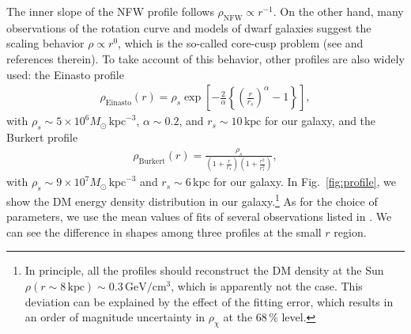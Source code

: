 \documentclass[12pt,twoside,book]{article}
\begin{document}
The inner slope of the NFW profile follows $\rho_{\mathrm{NFW}} \propto r^{-1}$.
On the other hand, many observations of the rotation curve and models of dwarf galaxies suggest the scaling behavior $\rho \propto r^0$, which is the so-called core-cusp problem (see \cite{Genina_2017} and references therein).
To take account of this behavior, other profiles are also widely used: the Einasto profile \cite{1965TrAlm...5...87E, Graham:2005xx}
\begin{align}
  \rho_{\mathrm{Einasto}} (r) = \rho_s \exp \left[
  -\frac{2}{\alpha} \left\{ \left( \frac{r}{r_s} \right)^\alpha - 1 \right\} \right],
\end{align}
with $\rho_s \sim 5 \times 10^6 M_\odot\, \mathrm{kpc}^{-3}$, $\alpha \sim 0.2$, and $r_s \sim 10\,\mathrm{kpc}$ for our galaxy, and the Burkert profile \cite{Burkert:1995yz}
\begin{align}
  \rho_{\mathrm{Burkert}} (r) = \frac{\rho_s}
  {\left( 1 + \frac{r}{r_s} \right) \left( 1 + \frac{r^2}{r_s^2} \right)},
\end{align}
with $\rho_s \sim 9 \times 10^7 M_\odot\, \mathrm{kpc}^{-3}$ and $r_s \sim 6\, \mathrm{kpc}$ for our galaxy.
In Fig.~\ref{fig:profile}, we show the DM energy density distribution in our galaxy.\footnote{
  In principle, all the profiles should reconstruct the DM density at the Sun $\rho (r \sim 8\, \mathrm{kpc}) \sim 0.3\, \mathrm{GeV} / \mathrm{cm}^3$, which is apparently not the case.
  This deviation can be explained by the effect of the fitting error, which results in an order of magnitude uncertainty in $\rho_\chi$ at the $68\,\%$ level.
}
As for the choice of parameters, we use the mean values of fits of several observations listed in \cite{Fornasa:2013iaa}.
We can see the difference in shapes among three profiles at the small $r$ region.
\end{document}
